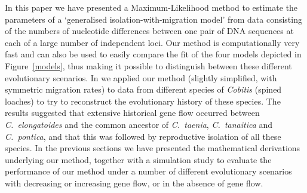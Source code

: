 \documentclass[11pt]{article}
\begin{document}
In this paper we have presented a Maximum-Likelihood method to estimate the parameters of a `generalised isolation-with-migration model' from data consisting of the numbers of nucleotide differences between one pair of DNA sequences at each of a large number of independent loci. Our method is computationally very fast and can also be used to easily compare the fit of the four models depicted in Figure~\ref{models}, thus making it possible to distinguish between these different evolutionary scenarios. In \citet{Janko2018} we applied 
our method (slightly simplified, with symmetric migration rates) to data from different species of {\em Cobitis} 
(spined loaches) 
to try to reconstruct the evolutionary history of these species. 
The results suggested that extensive historical gene flow occurred between {\em C.~elongatoides} and the common ancestor of {\em C.~taenia}, {\em C.~tanaitica} and {\em C.~pontica}, and that this was followed by reproductive isolation of all these species.
In the previous sections we have presented the mathematical derivations underlying our method, together with a simulation study to evaluate the performance of our method under a number of different evolutionary scenarios 
with decreasing or increasing gene flow, or in the absence of gene flow.
\end{document}
